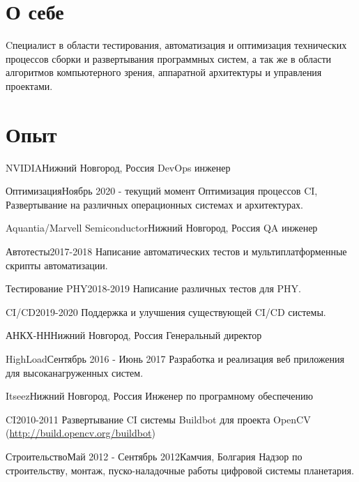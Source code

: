 \documentclass[12pt,a4paper]{moderncv}
\begin{document}
\maketitle

\section{О себе}
Cпециалист в области тестирования, автоматизация и оптимизация технических процессов сборки и развертывания программных систем,
а так же в области алгоритмов компьютерного зрения, аппаратной архитектуры и управления проектами.

\section{Опыт}
	{NVIDIA}{Нижний Новгород, Россия}{}{}
	{DevOps инженер}

\cventry{}
	{Оптимизация}{Ноябрь 2020 - текущий момент}{}{}
	{Оптимизация процессов CI, Развертывание на различных операционных системах и архитектурах.}

	{Aquantia/Marvell Semiconductor}{Нижний Новгород, Россия}{}{}
	{QA инженер}

\cventry{}
	{Автотесты}{2017-2018}{}{}
	{Написание автоматических тестов и мультиплатформенные скрипты автоматизации.}

\cventry{}
	{Тестирование PHY}{2018-2019}{}{}
	{Написание различных тестов для PHY.}

\cventry{}
	{CI/CD}{2019-2020}{}{}
	{Поддержка и улучшения существующей CI/CD системы.}

	{АНКХ-НН}{Нижний Новгород, Россия}{}{}
	{Генеральный директор}

\cventry{}
	{HighLoad}{Сентябрь 2016 - Июнь 2017}{}{}
	{Разработка и реализация веб приложения для высоканагруженных систем.}

	{Itseez}{Нижний Новгород, Россия}{}{}
	{Инженер по програмному обеспечению}

\cventry{}
	{CI}{2010-2011}{}{}
	{Развертывание CI системы Buildbot для проекта OpenCV \newline(\url{http://build.opencv.org/buildbot})}

\cventry{}
	{Строительство}{Май 2012 - Сентябрь 2012}{Камчия, Болгария}{}
	{Надзор по строительству, монтаж, пуско-наладочные работы цифровой системы планетария.}
\end{document}
